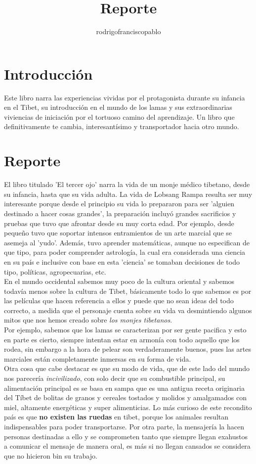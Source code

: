 \documentclass{mylib/reporte}
\title{Reporte}
\author{rodrigofranciscopablo }
\begin{document}
\coverPage

\section{Introducción}

Este libro narra las experiencias vividas por el protagonista durante su infancia en el Tibet, su introducción en el mundo de los lamas y sus extraordinarias viviencias de iniciación por el tortuoso camino del aprendizaje. Un libro que definitivamente te cambia, interesantísimo y transportador hacia otro mundo.


\section{Reporte}

El libro titulado 'El tercer ojo' narra la vida de un monje médico tibetano, desde su infancia, hasta que su vida adulta. La vida de Lobsang Rampa resulta ser muy interesante porque desde el principio su vida lo prepararon para ser 'alguien destinado a hacer cosas grandes', la preparación incluyó grandes sacrificios y pruebas que tuvo que afrontar desde su muy corta edad. Por ejemplo, desde pequeño tuvo que soportar intensos entramientos de un arte marcial que se asemeja al 'yudo'. Además, tuvo aprender matemáticas, aunque no especifican de que tipo, para poder comprender astrología, la cual era considerada una ciencia en su país e inclusive con base en esta 'ciencia' se tomaban decisiones de todo tipo, políticas, agropecuarias, etc. \\

En el mundo occidental sabemos muy poco de la cultura oriental y sabemos todavía menos sobre la cultura de Tibet, básicamente todo lo que sabemos es por las películas que hacen referencia a ellos y puede que no sean ideas del todo correcto, a medida que el personaje cuenta sobre su vida va desmintiendo algunos mitos que nos hemos creado sobre \textit{los monjes tibetanos}.\\
Por ejemplo, sabemos que los lamas se caracterizan por ser gente pacifica y esto en parte es cierto, siempre intentan estar en armonía con todo aquello que los rodea, sin embargo a la hora de pelear son verdaderamente buenos, pues las artes marciales están completamente inmersas en su forma de vida.\\

Otra cosa que cabe destacar es que su modo de vida, que de este lado del mundo nos parecería \textit{incivilizado}, con solo decir que su combustible principal, su alimentación principal es se basa en sampa que es una antigua receta originaria del Tíbet de bolitas de granos y cereales tostados y molidos y amalgamados con miel, altamente energéticas y super alimenticias. Lo más curioso de este recondito país es que \textbf{no existen las ruedas } en tibet, porque los animales resultan indispensables para poder transportarse.
Por otra parte, la mensajería la hacen personas destinadas a ello y se comprometen tanto que siempre llegan exahustos a comunicar el mensaje de manera oral, es más si no llegan cansados se considera que no hicieron bin su trabajo.


\end{document}
